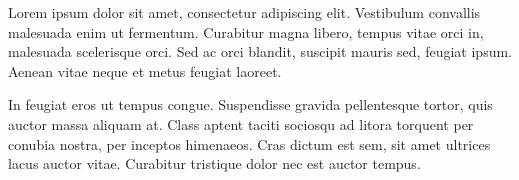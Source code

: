 \begin{acknowledgements}
Lorem ipsum dolor sit amet, consectetur adipiscing elit. Vestibulum convallis malesuada enim ut fermentum. Curabitur magna libero, tempus vitae orci in, malesuada scelerisque orci. Sed ac orci blandit, suscipit mauris sed, feugiat ipsum. Aenean vitae neque et metus feugiat laoreet. 

In feugiat eros ut tempus congue. Suspendisse gravida pellentesque tortor, quis auctor massa aliquam at. Class aptent taciti sociosqu ad litora torquent per conubia nostra, per inceptos himenaeos. Cras dictum est sem, sit amet ultrices lacus auctor vitae. Curabitur tristique dolor nec est auctor tempus.

\end{acknowledgements}



